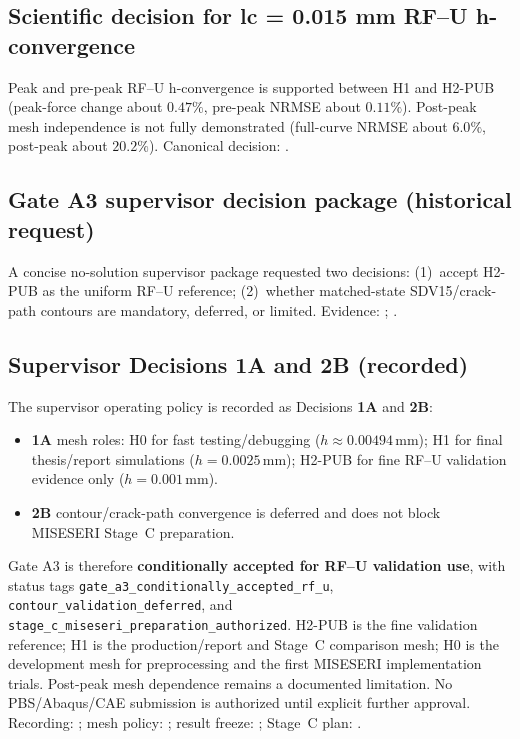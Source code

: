 \documentclass[11pt,a4paper]{article}
\begin{document}
\subsection{Scientific decision for lc = 0.015 mm RF--U h-convergence}

Peak and pre-peak RF--U h-convergence is supported between H1 and H2-PUB
(peak-force change about \(0.47\%\), pre-peak NRMSE about \(0.11\%\)).
Post-peak mesh independence is not fully demonstrated
(full-curve NRMSE about \(6.0\%\), post-peak about \(20.2\%\)).
Canonical decision: .

\subsection{Gate A3 supervisor decision package (historical request)}

A concise no-solution supervisor package requested two decisions:
(1)~accept H2-PUB as the uniform RF--U reference;
(2)~whether matched-state SDV15/crack-path contours are mandatory, deferred, or limited.
Evidence: ;
.

\subsection{Supervisor Decisions 1A and 2B (recorded)}

The supervisor operating policy is recorded as Decisions \textbf{1A} and \textbf{2B}:
\begin{itemize}
  \item \textbf{1A} mesh roles: H0 for fast testing/debugging (\(h\approx 0.00494\,\mathrm{mm}\));
        H1 for final thesis/report simulations (\(h=0.0025\,\mathrm{mm}\));
        H2-PUB for fine RF--U validation evidence only (\(h=0.001\,\mathrm{mm}\)).
  \item \textbf{2B} contour/crack-path convergence is deferred and does not block
        MISESERI Stage~C preparation.
\end{itemize}
Gate A3 is therefore \textbf{conditionally accepted for RF--U validation use}, with status tags
\texttt{gate\_a3\_conditionally\_accepted\_rf\_u},
\texttt{contour\_validation\_deferred}, and
\texttt{stage\_c\_miseseri\_preparation\_authorized}.
H2-PUB is the fine validation reference; H1 is the production/report and Stage~C comparison mesh;
H0 is the development mesh for preprocessing and the first MISESERI implementation trials.
Post-peak mesh dependence remains a documented limitation.
No PBS/Abaqus/CAE submission is authorized until explicit further approval.
Recording: ;
mesh policy: ;
result freeze: ;
Stage~C plan: .
\end{document}
